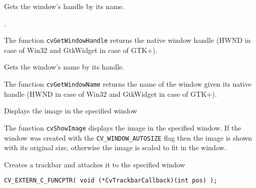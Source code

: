 
Gets the window's handle by its name.


\begin{description}
.
\end{description}

The function \texttt{cvGetWindowHandle} returns the native window handle (HWND in case of Win32 and GtkWidget in case of GTK+).


Gets the window's name by its handle.


\begin{description}
\end{description}

The function \texttt{cvGetWindowName} returns the name of the window given its native handle (HWND in case of Win32 and GtkWidget in case of GTK+).


Displays the image in the specified window


\begin{description}
\end{description}

The function \texttt{cvShowImage} displays the image in the specified window. If the window was created with the \texttt{CV\_WINDOW\_AUTOSIZE} flag then the image is shown with its original size, otherwise the image is scaled to fit in the window.


Creates a trackbar and attaches it to the specified window

\begin{lstlisting}
CV_EXTERN_C_FUNCPTR( void (*CvTrackbarCallback)(int pos) );
\end{lstlisting}

